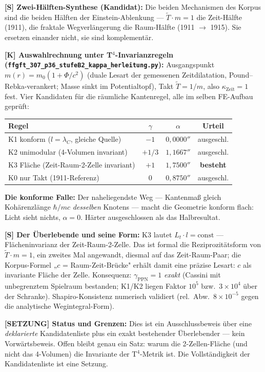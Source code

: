 \documentclass[11pt]{report}
\begin{document}
\medskip
\textbf{[S] Zwei-Hälften-Synthese (Kandidat):} Die beiden
Mechanismen des Korpus sind die beiden Hälften der
Einstein-Ablenkung — $\tilde T \cdot m = 1$ die Zeit-Hälfte
(1911), die fraktale Wegverlängerung die Raum-Hälfte (1911
$\to$ 1915). Sie ersetzen einander nicht, sie sind komplementär.

\medskip
\textbf{[K] Auswahlrechnung unter T$^4$-Invarianzregeln
(\texttt{ffgft\_307\_p36\_stufeB2\_kappa\_herleitung.py}):}
Ausgangspunkt $m(r) = m_0(1+\Phi/c^2)$ (duale Lesart der gemessenen
Zeitdilatation, Pound--Rebka-verankert; Masse sinkt im
Potentialtopf), Takt $\tilde T = 1/m$, also
$\kappa_{\text{Zeit}} = 1$ fest. Vier Kandidaten für die räumliche
Kantenregel, alle im selben FE-Aufbau geprüft:

\begin{center}
\begin{tabular}{lccc}
\toprule
Regel & $\gamma$ & $\alpha$ & Urteil\\
\midrule
K1 konform ($l = \lambda_C$, gleiche Quelle) & $-1$ & $0{,}0000''$ & ausgeschl.\\
K2 unimodular (4-Volumen invariant) & $+1/3$ & $1{,}1667''$ & ausgeschl.\\
K3 Fläche (Zeit-Raum-2-Zelle invariant) & $+1$ & $1{,}7500''$ & \textbf{besteht}\\
K0 nur Takt (1911-Referenz) & $0$ & $0{,}8750''$ & ausgeschl.\\
\bottomrule
\end{tabular}
\end{center}

\textbf{Die konforme Falle:} Der naheliegendste Weg — Kantenmaß
gleich Kohärenzlänge $\hbar/mc$ \emph{desselben} Knotens — macht
die Geometrie konform flach: Licht sieht nichts, $\alpha = 0$.
Härter ausgeschlossen als das Halbresultat.

\medskip
\textbf{[S] Der Überlebende und seine Form:} K3 lautet
$L_t \cdot l = \text{const}$ — Flächeninvarianz der
Zeit-Raum-2-Zelle. Das ist formal die Reziprozitätsform von
$\tilde T \cdot m = 1$, ein zweites Mal angewandt, diesmal auf das
Zeit-Raum-Paar; die Korpus-Formel „$c$ = Raum-Zeit-Brücke" erhält
damit eine präzise Lesart: $c$ als invariante Fläche der Zelle.
Konsequenz: $\gamma_{\text{PPN}} = 1$ \emph{exakt} (Cassini mit
unbe\-grenztem Spielraum bestanden; K1/K2 liegen Faktor $10^5$
bzw.\ $3\times10^4$ über der Schranke). Shapiro-Konsistenz
numerisch validiert (rel.\ Abw.\ $8\times10^{-5}$ gegen die
analytische Wegintegral-Form).

\medskip
\textbf{[SETZUNG] Status und Grenzen:} Dies ist ein
Ausschlussbeweis über eine \emph{deklarierte} Kandidatenliste plus
ein exakt bestehender Überlebender — kein Vorwärtsbeweis. Offen
bleibt genau ein Satz: warum die 2-Zellen-Fläche (und nicht das
4-Volumen) die Invariante der T$^4$-Metrik ist. Die
Vollständigkeit der Kandidatenliste ist eine Setzung.
\end{document}
